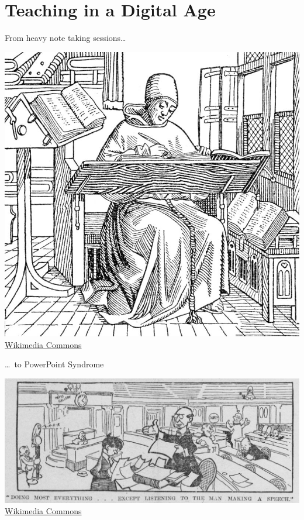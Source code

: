 
\section{Teaching in a Digital Age}

\begin{frame}
  \centering
  From heavy note taking sessions\dots \\
  \begin{minipage}{0.55\linewidth}
    \includegraphics[width=\linewidth,keepaspectratio]{796px-Monkcopyistwoodcut} \\
    \tiny \href{https://commons.wikimedia.org/wiki/File:Monkcopyistwoodcut.jpg}{Wikimedia Commons}
  \end{minipage}
\end{frame}

\begin{frame}
  \centering
  \dots\ to PowerPoint Syndrome \\
  \begin{minipage}{\linewidth}
    \includegraphics[width=\linewidth,keepaspectratio]{Satterfield_watches_Congress_be_boring} \\
    \tiny \href{https://commons.wikimedia.org/wiki/File:Satterfield_watches_Congress_be_boring.jpg}{Wikimedia Commons}
  \end{minipage}
\end{frame}

